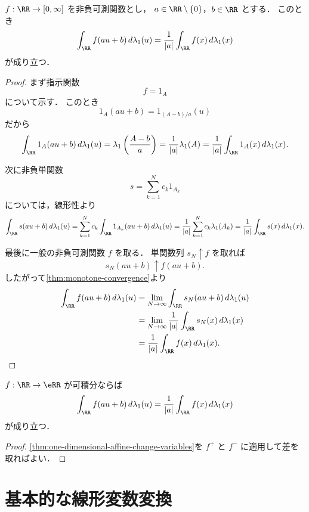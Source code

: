 \begin{theorem}\label{thm:one-dimensional-affine-change-variables}
$f:\RR\to[0,\infty]$ を非負可測関数とし，
$a\in\RR\setminus\{0\}$，$b\in\RR$ とする．
このとき
\[
\int_{\RR}f(au+b)\,d\lambda_1(u)
=
\frac{1}{|a|}\int_{\RR}f(x)\,d\lambda_1(x)
\]
が成り立つ．
\end{theorem}
\begin{proof}
まず指示関数
\[
f=1_A
\]
について示す．
このとき
\[
1_A(au+b)=1_{(A-b)/a}(u)
\]
だから
\[
\int_{\RR}1_A(au+b)\,d\lambda_1(u)
=
\lambda_1\left(\frac{A-b}{a}\right)
=
\frac{1}{|a|}\lambda_1(A)
=
\frac{1}{|a|}\int_{\RR}1_A(x)\,d\lambda_1(x).
\]

次に非負単関数
\[
s=\sum_{k=1}^N c_k1_{A_k}
\]
については，線形性より
\[
\int_{\RR}s(au+b)\,d\lambda_1(u)
=
\sum_{k=1}^N c_k\int_{\RR}1_{A_k}(au+b)\,d\lambda_1(u)
=
\frac{1}{|a|}\sum_{k=1}^N c_k\lambda_1(A_k)
=
\frac{1}{|a|}\int_{\RR}s(x)\,d\lambda_1(x).
\]

最後に一般の非負可測関数 $f$ を取る．
単関数列 $s_N\uparrow f$ を取れば
\[
s_N(au+b)\uparrow f(au+b).
\]
したがって\cref{thm:monotone-convergence}より
\begin{align*}
\int_{\RR}f(au+b)\,d\lambda_1(u)
&=
\lim_{N\to\infty}\int_{\RR}s_N(au+b)\,d\lambda_1(u) \\
&=
\lim_{N\to\infty}\frac{1}{|a|}\int_{\RR}s_N(x)\,d\lambda_1(x) \\
&=
\frac{1}{|a|}\int_{\RR}f(x)\,d\lambda_1(x).
\end{align*}
\end{proof}

\begin{corollary}\label{cor:one-dimensional-affine-change-variables-integrable}
$f:\RR\to\eRR$ が可積分ならば
\[
\int_{\RR}f(au+b)\,d\lambda_1(u)
=
\frac{1}{|a|}\int_{\RR}f(x)\,d\lambda_1(x)
\]
が成り立つ．
\end{corollary}
\begin{proof}
\cref{thm:one-dimensional-affine-change-variables}を $f^+$ と $f^-$ に適用して差を取ればよい．
\end{proof}

\section{基本的な線形変数変換}

